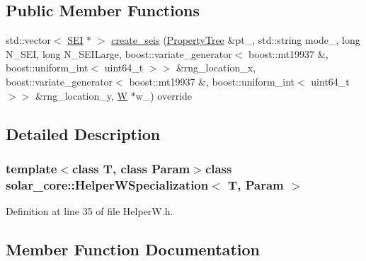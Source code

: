 \subsection*{Public Member Functions}
\begin{DoxyCompactItemize}
\item 
std\+::vector$<$ \hyperlink{classsolar__core_1_1_s_e_i}{S\+E\+I} $\ast$ $>$ \hyperlink{classsolar__core_1_1_helper_w_specialization_a738f047f9e421dcac3739f9898242c09}{create\+\_\+seis} (\hyperlink{namespacesolar__core_adeda2737d6938c190eb774a5b2495045}{Property\+Tree} \&pt\+\_\+, std\+::string mode\+\_\+, long N\+\_\+\+S\+E\+I, long N\+\_\+\+S\+E\+I\+Large, boost\+::variate\+\_\+generator$<$ boost\+::mt19937 \&, boost\+::uniform\+\_\+int$<$ uint64\+\_\+t $>$$>$ \&rng\+\_\+location\+\_\+x, boost\+::variate\+\_\+generator$<$ boost\+::mt19937 \&, boost\+::uniform\+\_\+int$<$ uint64\+\_\+t $>$$>$ \&rng\+\_\+location\+\_\+y, \hyperlink{classsolar__core_1_1_w}{W} $\ast$w\+\_\+) override
\end{DoxyCompactItemize}


\subsection{Detailed Description}
\subsubsection*{template$<$class T, class Param$>$class solar\+\_\+core\+::\+Helper\+W\+Specialization$<$ T, Param $>$}



Definition at line 35 of file Helper\+W.\+h.



\subsection{Member Function Documentation}
\hypertarget{classsolar__core_1_1_helper_w_specialization_a738f047f9e421dcac3739f9898242c09}{}
